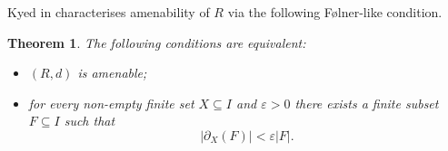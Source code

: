 \documentclass[11 pt, leqno]{amsart}
\newcommand{\eps}{\varepsilon}
\newcommand{\NN}{\mathbb{N}}
\DeclareMathOperator{\Fol}{F\mathrm{\o}l}
\DeclareMathOperator{\Folinn}{F\mathrm{\o}l^{inn}}
\DeclareMathOperator{\inn}{inn}
\newtheorem{theorem}{Theorem}[section]
\newtheorem{proposition}[theorem]{Proposition}
\theoremstyle{definition}
\numberwithin{equation}{section}
\begin{document}

Kyed in \cite[Theorem 3.3]{Kyed} characterises amenability of $R$ via the following F\o lner-like condition.
\begin{theorem}\label{th:Kyed}
	The following conditions are equivalent:
	\begin{itemize}
		\item[(i)] $(R,d)$ is amenable;
		\item[(ii)] for every non-empty finite set $X\subseteq I$ and $\eps>0$ there exists a finite subset $F\subseteq I$ such that
		\begin{equation}\label{eq3}
		|\partial_X(F)|< \eps |F|.
		\end{equation}
	\end{itemize}
\end{theorem}
\end{document}

